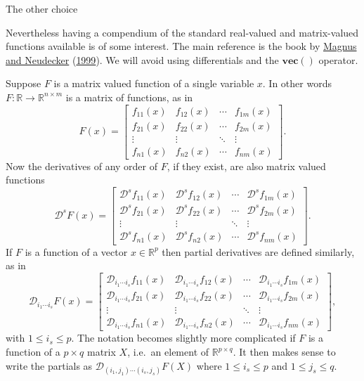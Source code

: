 \documentclass[
  12pt,
]{book}
\begin{document}
The other choice

Nevertheless having a compendium of the standard real-valued and matrix-valued functions available is of some interest. The main reference is the book by \protect\hyperlink{ref-magnus_neudecker_99}{Magnus and Neudecker} (\protect\hyperlink{ref-magnus_neudecker_99}{1999}). We will avoid using differentials and the \(\mathbf{vec}()\) operator.

Suppose \(F\) is a matrix valued function of a single variable \(x\). In other words \(F:\mathbb{R}\rightarrow\mathbb{R}^{n\times m}\) is a matrix of functions, as in
\[
F(x)=
\begin{bmatrix}
f_{11}(x)&f_{12}(x)&\cdots&f_{1m}(x)\\
f_{21}(x)&f_{22}(x)&\cdots&f_{2m}(x)\\
\vdots&\vdots&\ddots&\vdots\\
f_{n1}(x)&f_{n2}(x)&\cdots&f_{nm}(x)
\end{bmatrix}.
\]
Now the derivatives of any order of \(F\), if they exist, are also matrix valued functions
\[
\mathcal{D}^sF(x)=
\begin{bmatrix}
\mathcal{D}^sf_{11}(x)&\mathcal{D}^sf_{12}(x)&\cdots&\mathcal{D}^sf_{1m}(x)\\
\mathcal{D}^sf_{21}(x)&\mathcal{D}^sf_{22}(x)&\cdots&\mathcal{D}^sf_{2m}(x)\\
\vdots&\vdots&\ddots&\vdots\\
\mathcal{D}^sf_{n1}(x)&\mathcal{D}^sf_{n2}(x)&\cdots&\mathcal{D}^sf_{nm}(x)
\end{bmatrix}.
\]
If \(F\) is a function of a vector \(x\in\mathbb{R}^p\) then partial derivatives are defined similarly, as in
\[
\mathcal{D}_{i_1\cdots i_s}F(x)=
\begin{bmatrix}
\mathcal{D}_{i_1\cdots i_s}f_{11}(x)&\mathcal{D}_{i_1\cdots i_s}f_{12}(x)&\cdots&\mathcal{D}_{i_1\cdots i_s}f_{1m}(x)\\
\mathcal{D}_{i_1\cdots i_s}f_{21}(x)&\mathcal{D}_{i_1\cdots i_s}f_{22}(x)&\cdots&\mathcal{D}_{i_1\cdots i_s}f_{2m}(x)\\
\vdots&\vdots&\ddots&\vdots\\
\mathcal{D}_{i_1\cdots i_s}f_{n1}(x)&\mathcal{D}_{i_1\cdots i_s}f_{n2}(x)&\cdots&\mathcal{D}_{i_1\cdots i_s}f_{nm}(x)
\end{bmatrix},
\]
with \(1\leq i_s\leq p.\)
The notation becomes slightly more complicated if \(F\) is a function of a \(p\times q\) matrix \(X\), i.e.~an element of \(\mathbb{R}^{p\times q}\). It then makes sense to write the partials as \(\mathcal{D}_{(i_1,j_1)\cdots(i_s,j_s)}F(X)\)
where \(1\leq i_s\leq p\) and \(1\leq j_s\leq q.\)
\end{document}
